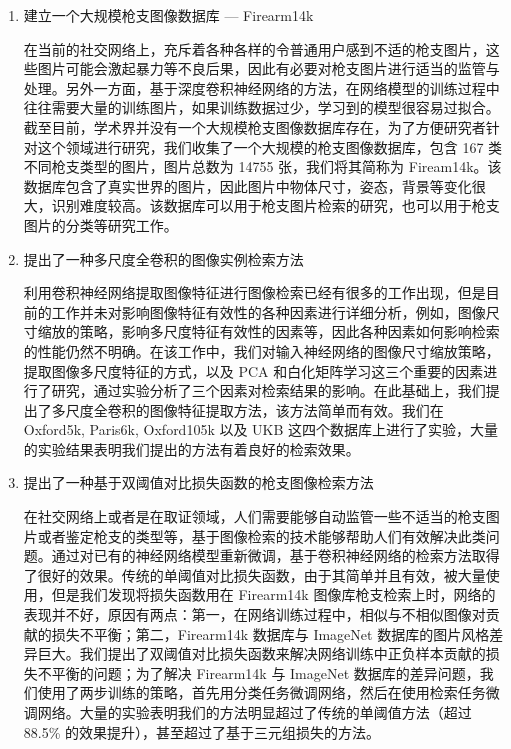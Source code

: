 \begin{enumerate}
\item 建立一个大规模枪支图像数据库 --- Firearm14k

在当前的社交网络上，充斥着各种各样的令普通用户感到不适的枪支图片，这些图片可能会激起暴力等不良后果，因此有必要对枪支图片进行适当的监管与处理。另外一方面，基于深度卷积神经网络的方法，在网络模型的训练过程中往往需要大量的训练图片，如果训练数据过少，学习到的模型很容易过拟合。截至目前，学术界并没有一个大规模枪支图像数据库存在，为了方便研究者针对这个领域进行研究，我们收集了一个大规模的枪支图像数据库，包含 167 类不同枪支类型的图片，图片总数为 14755 张，我们将其简称为 Fiream14k。该数据库包含了真实世界的图片，因此图片中物体尺寸，姿态，背景等变化很大，识别难度较高。该数据库可以用于枪支图片检索的研究，也可以用于枪支图片的分类等研究工作。

\item 提出了一种多尺度全卷积的图像实例检索方法

利用卷积神经网络提取图像特征进行图像检索已经有很多的工作出现，但是目前的工作并未对影响图像特征有效性的各种因素进行详细分析，例如，图像尺寸缩放的策略，影响多尺度特征有效性的因素等，因此各种因素如何影响检索的性能仍然不明确。在该工作中，我们对输入神经网络的图像尺寸缩放策略，提取图像多尺度特征的方式，以及 PCA 和白化矩阵学习这三个重要的因素进行了研究，通过实验分析了三个因素对检索结果的影响。在此基础上，我们提出了多尺度全卷积的图像特征提取方法，该方法简单而有效。我们在 Oxford5k, Paris6k, Oxford105k 以及 UKB 这四个数据库上进行了实验，大量的实验结果表明我们提出的方法有着良好的检索效果。

\item 提出了一种基于双阈值对比损失函数的枪支图像检索方法

在社交网络上或者是在取证领域，人们需要能够自动监管一些不适当的枪支图片或者鉴定枪支的类型等，基于图像检索的技术能够帮助人们有效解决此类问题。通过对已有的神经网络模型重新微调，基于卷积神经网络的检索方法取得了很好的效果。传统的单阈值对比损失函数，由于其简单并且有效，被大量使用，但是我们发现将损失函数用在 Firearm14k 图像库枪支检索上时，网络的表现并不好，原因有两点：第一，在网络训练过程中，相似与不相似图像对贡献的损失不平衡；第二，Firearm14k 数据库与 ImageNet 数据库的图片风格差异巨大。我们提出了双阈值对比损失函数来解决网络训练中正负样本贡献的损失不平衡的问题；为了解决 Firearm14k 与 ImageNet 数据库的差异问题，我们使用了两步训练的策略，首先用分类任务微调网络，然后在使用检索任务微调网络。大量的实验表明我们的方法明显超过了传统的单阈值方法（超过 88.5\% 的效果提升），甚至超过了基于三元组损失的方法。

\end{enumerate}


